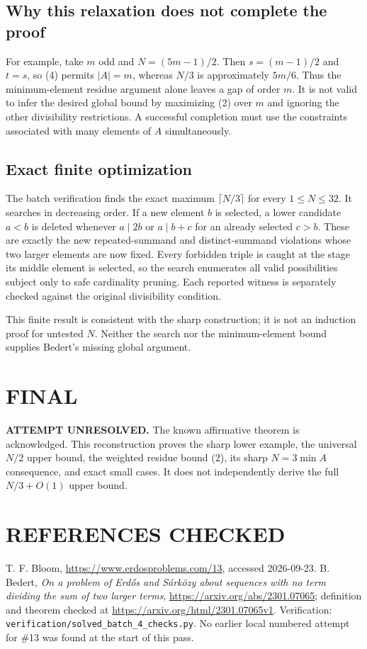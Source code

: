 \subsection{Why this relaxation does not complete the proof}
For example, take $m$ odd and $N=(5m-1)/2$. Then $s=(m-1)/2$ and $t=s$, so (4) permits $|A|=m$, whereas $N/3$ is approximately $5m/6$. Thus the minimum-element residue argument alone leaves a gap of order $m$. It is not valid to infer the desired global bound by maximizing (2) over $m$ and ignoring the other divisibility restrictions. A successful completion must use the constraints associated with many elements of $A$ simultaneously.

\subsection{Exact finite optimization}
The batch verification finds the exact maximum $\lceil N/3\rceil$ for every $1\le N\le32$. It searches in decreasing order. If a new element $b$ is selected, a lower candidate $a<b$ is deleted whenever $a\mid2b$ or $a\mid b+c$ for an already selected $c>b$. These are exactly the new repeated-summand and distinct-summand violations whose two larger elements are now fixed. Every forbidden triple is caught at the stage its middle element is selected, so the search enumerates all valid possibilities subject only to safe cardinality pruning. Each reported witness is separately checked against the original divisibility condition.

This finite result is consistent with the sharp construction; it is not an induction proof for untested $N$. Neither the search nor the minimum-element bound supplies Bedert's missing global argument.

\section{FINAL}
\textbf{ATTEMPT UNRESOLVED.} The known affirmative theorem is acknowledged. This reconstruction proves the sharp lower example, the universal $N/2$ upper bound, the weighted residue bound (2), its sharp $N=3\min A$ consequence, and exact small cases. It does not independently derive the full $N/3+O(1)$ upper bound.

\section{REFERENCES CHECKED}
T. F. Bloom, \url{https://www.erdosproblems.com/13}, accessed 2026-09-23. B. Bedert, \emph{On a problem of Erd\H{o}s and S\'ark\"ozy about sequences with no term dividing the sum of two larger terms}, \url{https://arxiv.org/abs/2301.07065}; definition and theorem checked at \url{https://arxiv.org/html/2301.07065v1}. Verification: \texttt{verification/solved\_batch\_4\_checks.py}. No earlier local numbered attempt for \#13 was found at the start of this pass.

